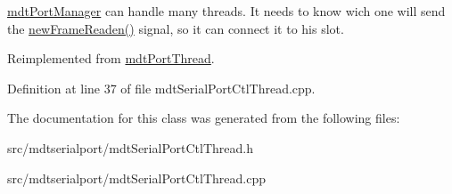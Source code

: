 \hyperlink{classmdt_port_manager}{mdtPortManager} can handle many threads. It needs to know wich one will send the \hyperlink{classmdt_port_thread_a7fc2245c753fd65e1beffec211c41461}{newFrameReaden()} signal, so it can connect it to his slot. 

Reimplemented from \hyperlink{classmdt_port_thread_acdb3d96287c571cc08ef39860dc324b1}{mdtPortThread}.



Definition at line 37 of file mdtSerialPortCtlThread.cpp.



The documentation for this class was generated from the following files:\begin{DoxyCompactItemize}
\item 
src/mdtserialport/mdtSerialPortCtlThread.h\item 
src/mdtserialport/mdtSerialPortCtlThread.cpp\end{DoxyCompactItemize}
